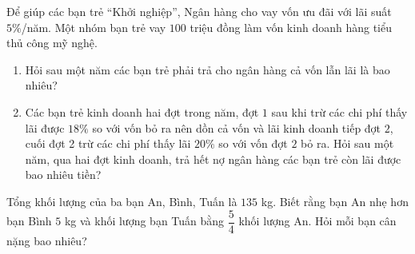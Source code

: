 \begin{bt}%
Để giúp các bạn trẻ “Khởi nghiệp”, Ngân hàng cho vay vốn ưu đãi với lãi suất $5\%$/năm. Một nhóm bạn trẻ vay $100$ triệu đồng làm vốn kinh doanh hàng tiểu thủ công mỹ nghệ. 
\begin{enumerate}
\item Hỏi sau một năm các bạn trẻ phải trả cho ngân hàng cả vốn lẫn lãi là bao nhiêu?  
\item Các bạn trẻ kinh doanh hai đợt trong năm, đợt $1$ sau khi trừ các chi phí thấy lãi được $18\%$ so với vốn bỏ ra nên dồn cả vốn và lãi kinh doanh tiếp đợt $2$, cuối đợt 2 trừ các chi phí thấy lãi $20\%$ so với vốn đợt $2$ bỏ ra. Hỏi sau một năm, qua hai đợt kinh doanh, trả hết nợ ngân hàng các bạn trẻ còn lãi được bao nhiêu tiền?  
\end{enumerate}
\end{bt}

\begin{bt}%
Tổng khối lượng của ba bạn An, Bình, Tuấn là $135$ kg. Biết rằng bạn An nhẹ hơn bạn Bình $5$ kg và khối lượng bạn Tuấn bằng $\dfrac{5}{4}$ khối lượng An. Hỏi mỗi bạn cân nặng bao nhiêu?
\end{bt}

